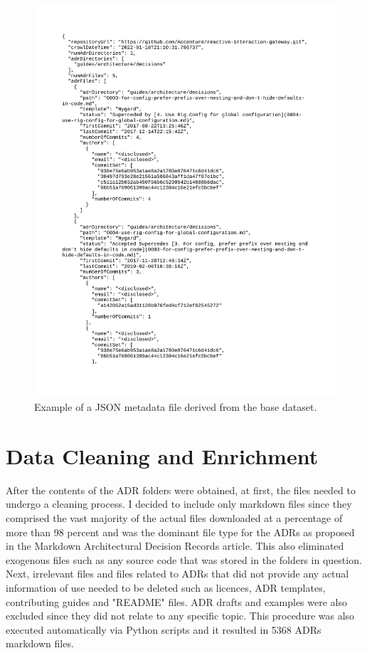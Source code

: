         \begin{figure}[]
            \centering
            \includegraphics[scale=0.4]{figures/JSON_data_example.png}
            \caption{Example of a JSON metadata file derived from the base dataset.}
            \label{fig:JSON_data}
        \end{figure}
        
    \section{Data Cleaning and Enrichment}
        After the contents of the ADR folders were obtained, at first, the files needed to undergo a cleaning process. I decided to include only markdown files since they comprised the vast majority of the actual files downloaded at a percentage of more than 98 percent and was the dominant file type for the ADRs as proposed in the Markdown Architectural Decision Records \cite{MarkdownADRs} article. This also eliminated exogenous files such as any source code that was stored in the folders in question. Next, irrelevant files and files related to ADRs that did not provide any actual information of use needed to be deleted such as licences, ADR templates, contributing guides and "README" files. ADR drafts and examples were also excluded since they did not relate to any specific topic. This procedure was also executed automatically via Python scripts and it resulted in 5368 ADRs markdown files.

